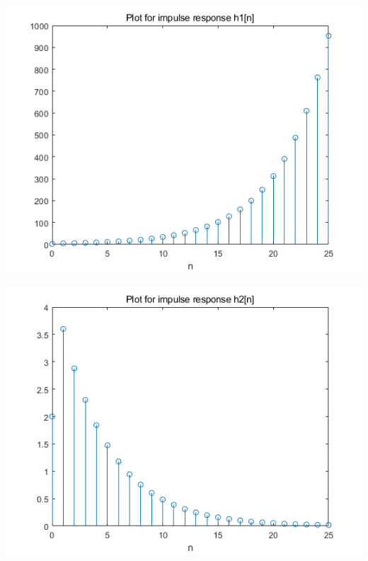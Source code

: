 \documentclass{article}
\begin{document}
\includegraphics[width=\textwidth]{QuestionTwoC1.png}

\includegraphics[width=\textwidth]{QuestionTwoC2.png}
\end{document}
